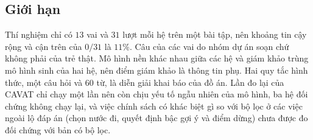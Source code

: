 \subsection{Giới hạn}
Thí nghiệm chỉ có $13$ vai và $31$ lượt mỗi hệ trên một bài tập, nên khoảng tin cậy rộng và cận trên của $0/31$ là $11\%$. Câu của các vai do nhóm dự án soạn chứ không phải của trẻ thật. Mô hình nền khác nhau giữa các hệ và giám khảo trùng mô hình sinh của hai hệ, nên điểm giám khảo là thông tin phụ. Hai quy tắc hình thức, một câu hỏi và $60$ từ, là diễn giải khai báo của đồ án. Lần đo lại của CAVAT chỉ chạy một lần nên còn chịu yếu tố ngẫu nhiên của mô hình, ba hệ đối chứng không chạy lại, và việc chính sách có khác biệt gì so với bộ lọc ở các việc ngoài lộ đáp án (chọn nước đi, quyết định bậc gợi ý và điểm dừng) chưa được đo đối chứng với bản có bộ lọc.
